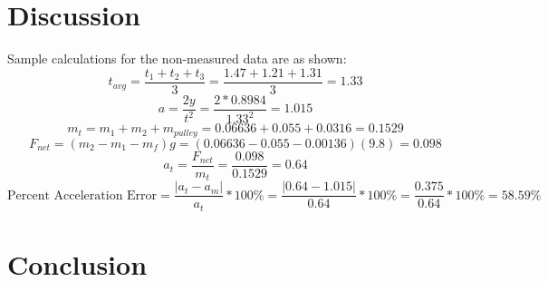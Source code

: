 \documentclass[11pt, titlepage]{article}
\begin{document}
\section*{Discussion}
Sample calculations for the non-measured data are as shown:
$$t_{avg} = \frac{t_1 + t_2 + t_3}{3} = \frac{1.47 + 1.21 + 1.31}{3} = 1.33$$
$$a = \frac{2y}{t^2} = \frac{2*0.8984}{1.33^2} = 1.015$$
$$m_t = m_1 + m_2 + m_{pulley} = 0.06636 + 0.055 + 0.0316 = 0.1529$$
$$F_{net} = (m_2 - m_1 - m_f)g = (0.06636 - 0.055 - 0.00136)(9.8) = 0.098$$
$$a_t = \frac{F_{net}}{m_t} = \frac{0.098}{0.1529} = 0.64$$
$$\text{Percent Acceleration Error} = \frac{|a_t - a_m|}{a_t}*100\% = \frac{|0.64 - 1.015|}{0.64}*100\% = \frac{0.375}{0.64}*100\% = 58.59\%$$

\section*{Conclusion}
\end{document}

